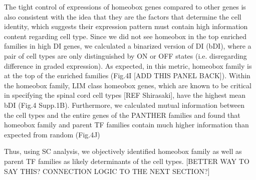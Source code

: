 The tight control of expressions of homeobox genes compared to other genes is also consistent with the idea that they are the factors that determine the cell identity, which suggests their expression pattern must contain high information content regarding cell type. Since we did not see homeobox in the top enriched families in high DI genes, we calculated a binarized version of DI (bDI), where a pair of cell types are only distinguished by ON or OFF states (i.e. disregarding difference in graded expression). As expected, in this metric, homeobox family is at the top of the enriched families (Fig.4I [ADD THIS PANEL BACK]). Within the homeobox family, LIM class homeobox genes, which are known to be critical in specifying the spinal cord cell types [REF Shirasaki], have the highest mean bDI (Fig.4 Supp.1B). Furthermore, we calculated mutual information between the cell types and the entire genes of the PANTHER families and found that homeobox family and parent TF families contain much higher information than expected from random (Fig.4J)

Thus, using SC analysis, we objectively identified homeobox family as well as parent TF families as likely determinants of the cell types. [BETTER WAY TO SAY THIS? CONNECTION LOGIC TO THE NEXT SECTION?]
